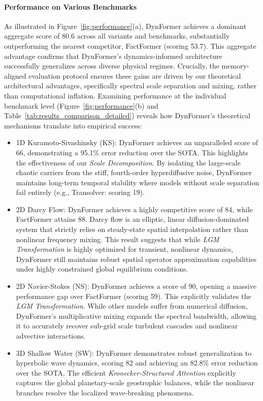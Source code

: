 \documentclass[final,3p,times]{elsarticle}
\begin{document}
\paragraph{Performance on Various Benchmarks}
As illustrated in Figure~\ref{fig:performance}(a), DynFormer achieves a dominant aggregate score of 80.6 across all variants and benchmarks, substantially outperforming the nearest competitor, FactFormer (scoring 53.7). This aggregate advantage confirms that DynFormer's dynamics-informed architecture successfully generalizes across diverse physical regimes. Crucially, the memory-aligned evaluation protocol ensures these gains are driven by our theoretical architectural advantages, specifically spectral scale separation and mixing, rather than computational inflation.
Examining performance at the individual benchmark level (Figure~\ref{fig:performance}(b) and Table~\ref{tab:results_comparison_detailed}) reveals how DynFormer's theoretical mechanisms translate into empirical success:
\begin{itemize}
    \item 1D Kuramoto-Sivashinsky (KS): DynFormer achieves an unparalleled score of 66, demonstrating a 95.1$\%$ error reduction over the SOTA. This highlights the effectiveness of our \textit{Scale Decomposition}. By isolating the large-scale chaotic carriers from the stiff, fourth-order hyperdiffusive noise, DynFormer maintains long-term temporal stability where models without scale separation fail entirely (e.g., Transolver: scoring 19).
    
    \item 2D Darcy Flow: DynFormer achieves a highly competitive score of 84, while FactFormer attains 88. Darcy flow is an elliptic, linear diffusion-dominated system that strictly relies on steady-state spatial interpolation rather than nonlinear frequency mixing. This result suggests that while \textit{LGM Transformation} is highly optimized for transient, nonlinear dynamics, DynFormer still maintains robust spatial operator approximation capabilities under highly constrained global equilibrium conditions.

    \item 2D Navier-Stokes (NS): DynFormer achieves a score of 90, opening a massive performance gap over FactFormer (scoring 59). This explicitly validates the \textit{LGM Transformation}. While other models suffer from numerical diffusion, DynFormer's multiplicative mixing expands the spectral bandwidth, allowing it to accurately recover sub-grid scale turbulent cascades and nonlinear advective interactions.
    
    \item 3D Shallow Water (SW): DynFormer demonstrates robust generalization to hyperbolic wave dynamics, scoring 82 and achieving an 82.8$\%$ error reduction over the SOTA. The efficient \textit{Kronecker-Structured Attention} explicitly captures the global planetary-scale geostrophic balances, while the nonlinear branches resolve the localized wave-breaking phenomena.
\end{itemize}
\end{document}
